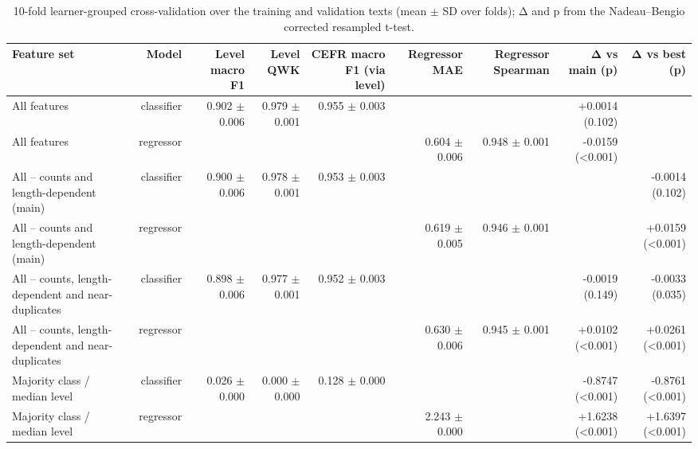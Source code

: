 \begin{table}[t]
\centering
\small
\begin{tabular}{lrrrrrrrr}
\toprule
Feature set & Model & Level macro F1 & Level QWK & CEFR macro F1 (via level) & Regressor MAE & Regressor Spearman & Δ vs main (p) & Δ vs best (p) \\
\midrule
All features & classifier & 0.902 $\pm$ 0.006 & 0.979 $\pm$ 0.001 & 0.955 $\pm$ 0.003 &  &  & +0.0014 (0.102) &  \\
All features & regressor &  &  &  & 0.604 $\pm$ 0.006 & 0.948 $\pm$ 0.001 & -0.0159 (<0.001) &  \\
All -- counts and length-dependent (main) & classifier & 0.900 $\pm$ 0.006 & 0.978 $\pm$ 0.001 & 0.953 $\pm$ 0.003 &  &  &  & -0.0014 (0.102) \\
All -- counts and length-dependent (main) & regressor &  &  &  & 0.619 $\pm$ 0.005 & 0.946 $\pm$ 0.001 &  & +0.0159 (<0.001) \\
All -- counts, length-dependent and near-duplicates & classifier & 0.898 $\pm$ 0.006 & 0.977 $\pm$ 0.001 & 0.952 $\pm$ 0.003 &  &  & -0.0019 (0.149) & -0.0033 (0.035) \\
All -- counts, length-dependent and near-duplicates & regressor &  &  &  & 0.630 $\pm$ 0.006 & 0.945 $\pm$ 0.001 & +0.0102 (<0.001) & +0.0261 (<0.001) \\
Majority class / median level & classifier & 0.026 $\pm$ 0.000 & 0.000 $\pm$ 0.000 & 0.128 $\pm$ 0.000 &  &  & -0.8747 (<0.001) & -0.8761 (<0.001) \\
Majority class / median level & regressor &  &  &  & 2.243 $\pm$ 0.000 &  & +1.6238 (<0.001) & +1.6397 (<0.001) \\
\bottomrule
\end{tabular}
\caption{10-fold learner-grouped cross-validation over the training and validation texts (mean $\pm$ SD over folds); Δ and p from the Nadeau–Bengio corrected resampled t-test.}
\label{tab:table_4_cross_validation}
\end{table}

